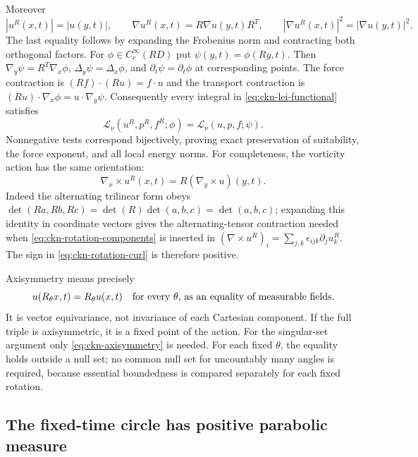 Moreover
\begin{equation}\label{eq:ckn-rotation-norms}
 |u^R(x,t)|=|u(y,t)|,\qquad
 \nabla u^R(x,t)=R\nabla u(y,t)R^T,\qquad
 |\nabla u^R(x,t)|^2=|\nabla u(y,t)|^2.
\end{equation}
The last equality follows by expanding the Frobenius norm and contracting
both orthogonal factors. For $\phi\in C_c^\infty(RD)$ put
$\psi(y,t)=\phi(Ry,t)$. Then
$\nabla_y\psi=R^T\nabla_x\phi$, $\Delta_y\psi=\Delta_x\phi$,
and $\partial_t\psi=\partial_t\phi$ at corresponding points.
The force contraction is $(Rf)\cdot(Ru)=f\cdot u$ and the transport
contraction is $(Ru)\cdot\nabla_x\phi=u\cdot\nabla_y\psi$.
Consequently every integral in \eqref{eq:ckn-lei-functional} satisfies
\begin{equation}\label{eq:ckn-rotation-lei}
 \mathcal L_\nu(u^R,p^R,f^R;\phi)
 =\mathcal L_\nu(u,p,f;\psi).
\end{equation}
Nonnegative tests correspond bijectively, proving exact preservation of
suitability, the force exponent, and all local energy norms.
For completeness, the vorticity action has the same orientation:
\begin{equation}\label{eq:ckn-rotation-curl}
 \nabla_x\times u^R(x,t)=R(\nabla_y\times u)(y,t).
\end{equation}
Indeed the alternating trilinear form obeys
$\det(Ra,Rb,Rc)=\det(R)\det(a,b,c)=\det(a,b,c)$;
expanding this identity in coordinate vectors gives the alternating-tensor
contraction needed when \eqref{eq:ckn-rotation-components} is inserted
in $(\nabla\times u^R)_i=\sum_{j,k}\epsilon_{ijk}\partial_j u^R_k$.
The sign in \eqref{eq:ckn-rotation-curl} is therefore positive.

Axisymmetry means precisely
\begin{equation}\label{eq:ckn-axisymmetry}
 u(R_\theta x,t)=R_\theta u(x,t)
 \quad\hbox{for every $\theta$, as an equality of measurable fields.}
\end{equation}
It is vector equivariance, not invariance of each Cartesian component.
If the full triple is axisymmetric, it is a fixed point of the action.
For the singular-set argument only \eqref{eq:ckn-axisymmetry} is needed.
For each fixed $\theta$, the equality holds outside a null set; no common
null set for uncountably many angles is required, because essential
boundedness is compared separately for each fixed rotation.

\subsection{The fixed-time circle has positive parabolic measure}

